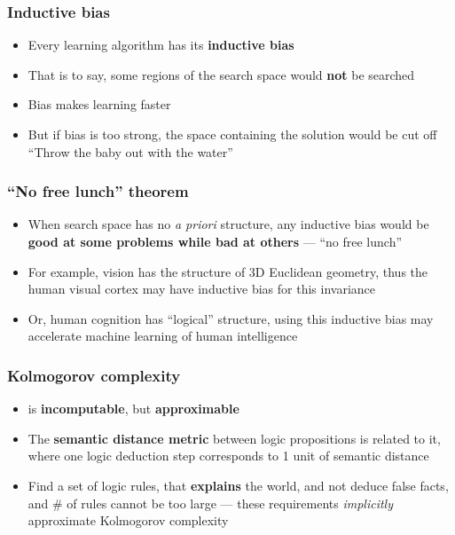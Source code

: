 \documentclass[17pt]{beamer}
\begin{document}
\begin{frame}
\frametitle{Inductive bias}
\begin{itemize}
	\item Every learning algorithm has its \textbf{inductive bias}
	\item That is to say, some regions of the search space would \textbf{not} be searched
	\item Bias makes learning faster
	\item But if bias is too strong, the space containing the solution would be cut off \\
	``Throw the baby out with the water''
\end{itemize}
\end{frame}

\begin{frame}
\frametitle{``No free lunch'' theorem}
\fontsize{16}{15}\selectfont
\begin{itemize}
	\item When search space has no \textit{a priori} structure, any inductive bias would be {\color{red}\textbf{good at some problems while bad at others}} --- ``no free lunch''
	\item For example, vision has the structure of 3D Euclidean geometry, thus the human visual cortex may have inductive bias for this invariance
	\item Or, human cognition has ``logical'' structure, using this inductive bias may accelerate machine learning of human intelligence
\end{itemize}
\end{frame}

\begin{frame}
\frametitle{Kolmogorov complexity}
\fontsize{16}{15}\selectfont
\begin{itemize}
	\item is {\color{red}\textbf{incomputable}}, but {\color{red}\textbf{approximable}}
	\item The {\color{red}\textbf{semantic distance metric}} between logic propositions is related to it, where one logic deduction step corresponds to 1 unit of semantic distance
	\item Find a set of logic rules, that \textbf{explains} the world, and not deduce false facts, and \# of rules cannot be too large --- these requirements \textit{implicitly} approximate Kolmogorov complexity
\end{itemize}
\end{frame}
\end{document}
